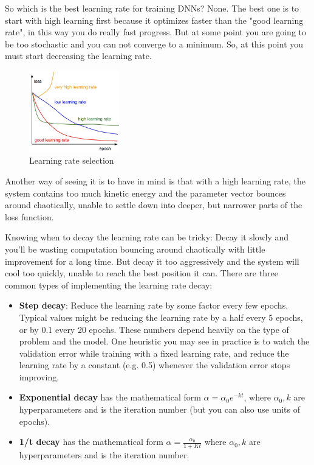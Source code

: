 So which is the best learning rate for training DNNs?
None. The best one is to start with high learning first because it optimizes faster than the "good learning rate", in this way you do really fast progress. But at some point you are going to be too stochastic and you can not converge to a minimum. So, at this point you must start decreasing the learning rate.

\begin{figure}[h]
  \centering
  \includegraphics[width=0.35\textwidth]{Images/params_up/3.jpeg}
  \caption{Learning rate selection}
\end{figure}

Another way of seeing it is to have in mind is that with a high learning rate, the system contains too much kinetic energy and the parameter vector bounces around chaotically, unable to settle down into deeper, but narrower parts of the loss function.

 Knowing when to decay the learning rate can be tricky: Decay it slowly and you’ll be wasting computation bouncing around chaotically with little improvement for a long time. But decay it too aggressively and the system will cool too quickly, unable to reach the best position it can. There are three common types of implementing the learning rate decay:

\begin{itemize}
\item \textbf{Step decay}: Reduce the learning rate by some factor every few epochs. Typical values might be reducing the learning rate by a half every 5 epochs, or by 0.1 every 20 epochs. These numbers depend heavily on the type of problem and the model. One heuristic you may see in practice is to watch the validation error while training with a fixed learning rate, and reduce the learning rate by a constant (e.g. 0.5) whenever the validation error stops improving.
\item \textbf{Exponential decay} has the mathematical form $\alpha = \alpha_0 e^{-kt}$, where $\alpha_0, k$ are hyperparameters and  is the iteration number (but you can also use units of epochs).
\item \textbf{1/t decay} has the mathematical form $\alpha = \frac{\alpha_0}{1+Kt}$ where $\alpha_0, k$ are hyperparameters and is the iteration number.
\end{itemize}


